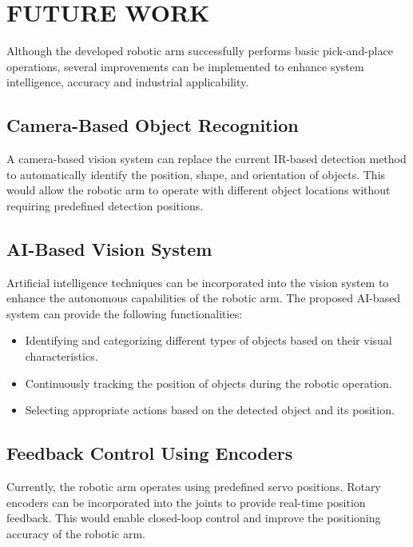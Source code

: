 \section{FUTURE WORK}

Although the developed robotic arm successfully performs basic pick-and-place
operations, several improvements can be implemented to enhance system
intelligence, accuracy and industrial applicability.

\subsection{Camera-Based Object Recognition}

A camera-based vision system can replace the current IR-based detection method
to automatically identify the position, shape, and orientation of objects.
This would allow the robotic arm to operate with different object locations
without requiring predefined detection positions.

\subsection{AI-Based Vision System}

Artificial intelligence techniques can be incorporated into the vision system
to enhance the autonomous capabilities of the robotic arm. The proposed
AI-based system can provide the following functionalities:

\begin{itemize}
    \item {} Identifying and categorizing
    different types of objects based on their visual characteristics.

    \item {} Continuously tracking the position of
    objects during the robotic operation.

    \item {} Selecting appropriate actions
    based on the detected object and its position.
\end{itemize}

\subsection{Feedback Control Using Encoders}

Currently, the robotic arm operates using predefined servo positions. Rotary
encoders can be incorporated into the joints to provide real-time position
feedback. This would enable closed-loop control and improve the positioning
accuracy of the robotic arm.

